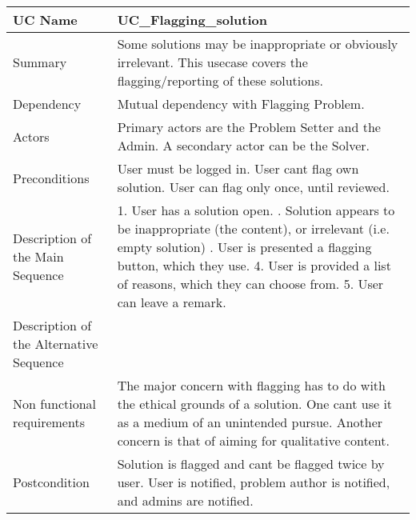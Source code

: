 \begin{table}[htbp]
\centering
\begin{tabularx}{\textwidth}{|l|X|}
\hline
UC Name & UC\_Flagging\_solution \\ \hline

Summary &  Some solutions may be inappropriate or obviously irrelevant. This usecase covers the flagging/reporting of these solutions. \\ \hline

Dependency & Mutual dependency with Flagging Problem. \\ \hline

Actors & Primary actors are the Problem Setter and the Admin. A secondary actor can be the Solver. \\ \hline

Preconditions & \- User must be logged in. \newline \- User cant flag own solution. \newline \- User can flag only once, until reviewed. \\ \hline

Description of the Main Sequence & 1. User has a solution open. \newline 2. Solution appears to be inappropriate (the content), or irrelevant (i.e. empty solution) \newline 3. User is presented a flagging button, which they use. 4. User is provided a list of reasons, which they can choose from. 5. User can leave a remark. \\ \hline

Description of the Alternative Sequence & \- \\ \hline

Non functional requirements & \- The major concern with flagging has to do with the ethical grounds of a solution. One cant use it as a medium of an unintended pursue. \newline \- Another concern is that of aiming for qualitative content. \\ \hline

Postcondition & \- Solution is flagged and cant be flagged twice by user. \newline \- User is notified, problem author is notified, and admins are notified. \\ \hline

\end{tabularx}
\end{table}

